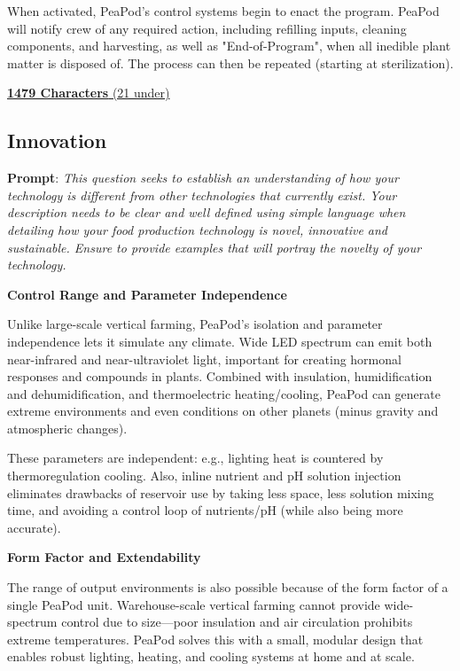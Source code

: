 \documentclass{../tex/report}
\begin{document}
When activated, PeaPod's control systems begin to enact the program. PeaPod will notify crew of any required action, including refilling inputs, cleaning components, and harvesting, as well as "End-of-Program", when all inedible plant matter is disposed of. The process can then be repeated (starting at sterilization).

\uline{\textbf{1479 Characters} (21 under)}

\newpage

\subsection{Innovation}
\label{sec:innovation}

\textbf{Prompt}: \textit{This question seeks to establish an understanding of how your technology is different from other technologies that currently exist. Your description needs to be clear and well defined using simple language when detailing how your food production technology is novel, innovative and sustainable. Ensure to provide examples that will portray the novelty of your technology.}


\textbf{Control Range and Parameter Independence}

Unlike large-scale vertical farming, PeaPod’s isolation and parameter independence lets it simulate any climate. Wide LED spectrum can emit both near-infrared and near-ultraviolet light, important for creating hormonal responses and compounds in plants. Combined with insulation, humidification and dehumidification, and thermoelectric heating/cooling, PeaPod can generate extreme environments and even conditions on other planets (minus gravity and atmospheric changes). 

These parameters are independent: e.g., lighting heat is countered by thermoregulation cooling. Also, inline nutrient and pH solution injection eliminates drawbacks of reservoir use by taking less space, less solution mixing time, and avoiding a control loop of nutrients/pH (while also being more accurate). 


\textbf{Form Factor and Extendability}

The range of output environments is also possible because of the form factor of a single PeaPod unit. Warehouse-scale vertical farming cannot provide wide-spectrum control due to size---poor insulation and air circulation prohibits extreme temperatures. PeaPod solves this with a small, modular design that enables robust lighting, heating, and cooling systems at home and at scale.
\end{document}
